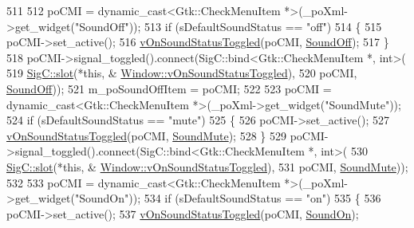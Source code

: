 \begin{DoxyCode}
{{511 
512   poCMI = \textcolor{keyword}{dynamic\_cast<}Gtk::CheckMenuItem *\textcolor{keyword}{>}(\_poXml->get\_widget(\textcolor{stringliteral}{"SoundOff"}));
513   \textcolor{keywordflow}{if} (sDefaultSoundStatus == \textcolor{stringliteral}{"off"})
514   \{
515     poCMI->set\_active();
516     \mbox{\hyperlink{class_v_b_a_1_1_window_af883be4dc5fbd611a2b5610aa26cfff7}{vOnSoundStatusToggled}}(poCMI, \mbox{\hyperlink{class_v_b_a_1_1_window_a0d5c8ea46df2e5d53537db8aa5ecc175a66f39df2434885c0cf719b9fe49d0cef}{SoundOff}});
517   \}
518   poCMI->signal\_toggled().connect(SigC::bind<Gtk::CheckMenuItem *, int>(
519                                     \mbox{\hyperlink{namespace_sig_c_a92e4f19202b77e78ac1db05f5a62f6b6}{SigC::slot}}(*\textcolor{keyword}{this}, &
      \mbox{\hyperlink{class_v_b_a_1_1_window_af883be4dc5fbd611a2b5610aa26cfff7}{Window::vOnSoundStatusToggled}}),
520                                     poCMI, \mbox{\hyperlink{class_v_b_a_1_1_window_a0d5c8ea46df2e5d53537db8aa5ecc175a66f39df2434885c0cf719b9fe49d0cef}{SoundOff}}));
521   m\_poSoundOffItem = poCMI;
522 
523   poCMI = \textcolor{keyword}{dynamic\_cast<}Gtk::CheckMenuItem *\textcolor{keyword}{>}(\_poXml->get\_widget(\textcolor{stringliteral}{"SoundMute"}));
524   \textcolor{keywordflow}{if} (sDefaultSoundStatus == \textcolor{stringliteral}{"mute"})
525   \{
526     poCMI->set\_active();
527     \mbox{\hyperlink{class_v_b_a_1_1_window_af883be4dc5fbd611a2b5610aa26cfff7}{vOnSoundStatusToggled}}(poCMI, \mbox{\hyperlink{class_v_b_a_1_1_window_a0d5c8ea46df2e5d53537db8aa5ecc175a6137309896b38578612c235600285276}{SoundMute}});
528   \}
529   poCMI->signal\_toggled().connect(SigC::bind<Gtk::CheckMenuItem *, int>(
530                                     \mbox{\hyperlink{namespace_sig_c_a92e4f19202b77e78ac1db05f5a62f6b6}{SigC::slot}}(*\textcolor{keyword}{this}, &
      \mbox{\hyperlink{class_v_b_a_1_1_window_af883be4dc5fbd611a2b5610aa26cfff7}{Window::vOnSoundStatusToggled}}),
531                                     poCMI, \mbox{\hyperlink{class_v_b_a_1_1_window_a0d5c8ea46df2e5d53537db8aa5ecc175a6137309896b38578612c235600285276}{SoundMute}}));
532 
533   poCMI = \textcolor{keyword}{dynamic\_cast<}Gtk::CheckMenuItem *\textcolor{keyword}{>}(\_poXml->get\_widget(\textcolor{stringliteral}{"SoundOn"}));
534   \textcolor{keywordflow}{if} (sDefaultSoundStatus == \textcolor{stringliteral}{"on"})
535   \{
536     poCMI->set\_active();
537     \mbox{\hyperlink{class_v_b_a_1_1_window_af883be4dc5fbd611a2b5610aa26cfff7}{vOnSoundStatusToggled}}(poCMI, \mbox{\hyperlink{class_v_b_a_1_1_window_a0d5c8ea46df2e5d53537db8aa5ecc175aa7efffeefb07fe04c5ad1f882b3d4f81}{SoundOn}});
}}
\end{DoxyCode}
